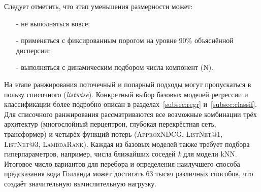 Следует отметить, что этап уменьшения размерности может:
\begin{itemize}[noitemsep, topsep=0pt, parsep=0pt, partopsep=0pt]
    \item[-] не выполняться вовсе;
    \item[-] применяться с фиксированным порогом на уровне 90\% объяснённой дисперсии;
    \item[-] выполняться с динамическим подбором числа компонент (N).
\end{itemize}
На этапе ранжирования поточечный и попарный подходы могут пропускаться в пользу списочного (\emph{listwise}). Конкретный выбор базовых моделей регрессии и классификации более подробно описан в разделах~\ref{subsec:regr} и~\ref{subsec:classif}. Для списочного ранжирования рассматриваются все возможные комбинации трёх архитектур (многослойный перцептрон, глубокая перекрёстная сеть, трансформер) и четырёх функций потерь (\textsc{ApproxNDCG}, \textsc{ListNet@1}, \textsc{ListNet@3}, \textsc{LambdaRank}). Каждая из базовых моделей также требует подбора гиперпараметров, например, числа ближайших соседей \textit{k} для модели kNN. Итоговое число вариантов для перебора и определения наилучшего способа предсказания кода Голланда может достигать 63 тысяч различных способов, что создаёт значительную вычислительную нагрузку.
